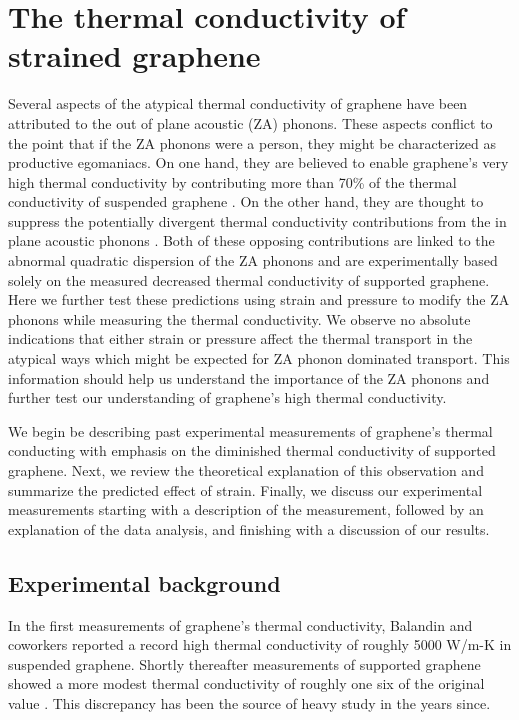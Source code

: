 \chapter{The thermal conductivity of strained graphene \label{chap:therm}}
Several aspects of the atypical thermal conductivity of graphene have been attributed to the out of plane acoustic (ZA) phonons.
These aspects conflict to the point that if the ZA phonons were a person, they might be characterized as productive egomaniacs.
On one hand, they are believed to enable graphene's very high thermal conductivity by contributing more than 70\% of the thermal conductivity of suspended graphene \cite{Lindsay2010}.
On the other hand, they are thought to suppress the potentially divergent thermal conductivity contributions from the in plane acoustic phonons \cite{Pereira2013,Bonini2012}.
Both of these opposing contributions are linked to the abnormal quadratic dispersion of the ZA phonons and are experimentally based solely on the measured decreased thermal conductivity of supported graphene.
Here we further test these predictions using strain and pressure to modify the ZA phonons while measuring the thermal conductivity.
We observe no absolute indications that either strain or pressure affect the thermal transport in the atypical ways which might be expected for ZA phonon dominated transport.
This information should help us understand the importance of the ZA phonons and further test our understanding of graphene's high thermal conductivity.

We begin be describing past experimental measurements of graphene's thermal conducting with emphasis on the diminished thermal conductivity of supported graphene.
Next, we review the theoretical explanation of this observation and summarize the predicted effect of strain.
Finally, we discuss our experimental measurements starting with a description of the measurement, followed by an explanation of the data analysis, and finishing with a discussion of our results.

\section{Experimental background \label{sec:therm:Exp}}
In the first measurements of graphene's thermal conductivity, Balandin and coworkers reported a record high thermal conductivity of roughly 5000 W/m-K \cite{Balandin2008} in suspended graphene.
Shortly thereafter measurements of supported graphene showed a more modest thermal conductivity of roughly one six of the original value \cite{Seol2010}.
This discrepancy has been the source of heavy study in the years since.

